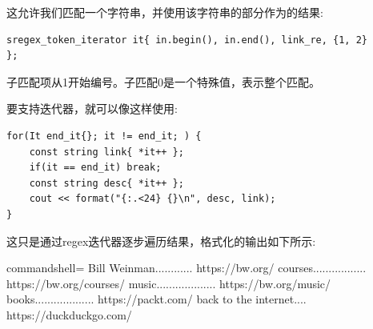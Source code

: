 这允许我们匹配一个字符串，并使用该字符串的部分作为的结果:

\begin{lstlisting}[style=styleCXX]
sregex_token_iterator it{ in.begin(), in.end(), link_re, {1, 2}
};
\end{lstlisting}

子匹配项从1开始编号。子匹配0是一个特殊值，表示整个匹配。

要支持迭代器，就可以像这样使用:

\begin{lstlisting}[style=styleCXX]
for(It end_it{}; it != end_it; ) {
	const string link{ *it++ };
	if(it == end_it) break;
	const string desc{ *it++ };
	cout << format("{:.<24} {}\n", desc, link);
}
\end{lstlisting}

这只是通过regex迭代器逐步遍历结果，格式化的输出如下所示:

\begin{tcblisting}{commandshell={}}
Bill Weinman............ https://bw.org/
courses................. https://bw.org/courses/
music................... https://bw.org/music/
books................... https://packt.com/
back to the internet.... https://duckduckgo.com/
\end{tcblisting}












